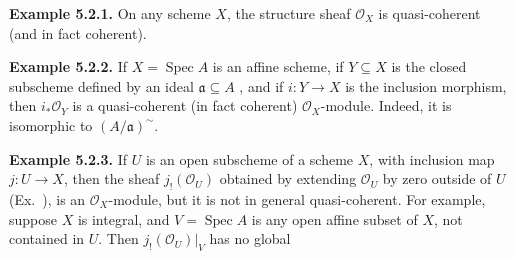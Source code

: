 {\medskip
\noindent\hypertarget{result-II-5.2.1}{}\textbf{Example 5.2.1.} On any scheme $X$, the structure sheaf $\mathcal O_X$ is quasi-coherent (and in fact coherent).

\medskip
\noindent\hypertarget{result-II-5.2.2}{}\textbf{Example 5.2.2.} If $X=\operatorname{Spec}A$ is an affine scheme, if $Y\subseteq X$ is the closed subscheme defined by an ideal $\mathfrak a\subseteq A$ , and if $i\colon Y\to X$ is the inclusion morphism, then $i_*\mathcal O_Y$ is a quasi-coherent (in fact coherent) $\mathcal O_X$-module. Indeed, it is isomorphic to $(A/\mathfrak a)^\sim$.

\medskip
\noindent\hypertarget{result-II-5.2.3}{}\textbf{Example 5.2.3.} If $U$ is an open subscheme of a scheme $X$, with inclusion map $j\colon U\to X$, then the sheaf $j_!(\mathcal O_U)$ obtained by extending $\mathcal O_U$ by zero outside of $U$ (Ex.~), is an $\mathcal O_X$-module, but it is not in general quasi-coherent. For example, suppose $X$ is integral, and $V=\operatorname{Spec}A$ is any open affine subset of $X$, not contained in $U$. Then $j_!(\mathcal O_U)|_V$ has no global
}
